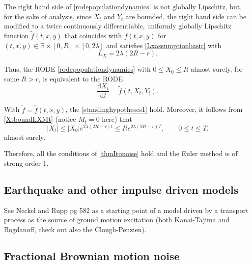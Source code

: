 \documentclass[reqno,12pt]{amsart}
\theoremstyle{plain}%
\theoremstyle{definition}
\begin{document}
The right hand side of \eqref{rodepopulationdynamics} is not globally Lipschitz, but, for the sake of analysis, since $X_t$ and $Y_t$ are bounded, the right hand side can be modified to a twice continuously differentiable, uniformly globally Lipschitz function $\tilde f(t, x, y)$ that coincides with $f(t, x, y)$ for $(t, x, y) \in \mathbb{R}\times [0, R]\times [0, 2\lambda]$ and satisfies \eqref{Lxassumptionbasic} with
\[
    L_X = 2\lambda (2R - r).
\]

Thus, the RODE \eqref{rodepopulationdynamics} with $0\leq X_0 \leq R$ almost surely, for some $R > r$, is equivalent to the RODE
\begin{equation}
    \label{rodepopulationdynamicstruncated}
    \frac{\mathrm{d}X_t}{\mathrm{d}t} = \tilde f(t, X_t, Y_t).
\end{equation}

With $\tilde f=\tilde f(t, x, y)$, the \cref{standinghypotheses1} hold. Moreover, it follows from \eqref{XtboundLXMt} (notice $M_t = 0$ here) that
\[
    |X_t| \leq |X_0|e^{2\lambda (2R - r)t} \leq R e^{2\lambda (2R - r)T}, \qquad 0 \leq t \leq T.
\]
almost surely. 

Therefore, all the conditions of \cref{thmItonoise} hold and the Euler method is of strong order 1.

\subsection{Earthquake and other impulse driven models}

See Neckel and Rupp pg 582 as a starting point of a model driven by a transport process as the source of ground motion excitation (both Kanai-Tajima and Bogdanoff, check out also the Clough-Penzien).

\subsection{Fractional Brownian motion noise}
\end{document}

